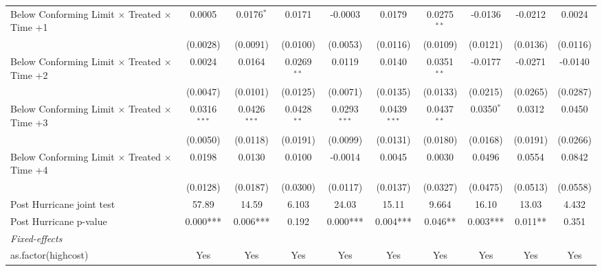 \begin{tabular}{lccccccccc}
   Below Conforming Limit $\times$ Treated $\times$ Time +1   & 0.0005         & 0.0176$^{*}$   & 0.0171        & -0.0003        & 0.0179         & 0.0275$^{**}$ & -0.0136      & -0.0212   & 0.0024\\   
                                                              & (0.0028)       & (0.0091)       & (0.0100)      & (0.0053)       & (0.0116)       & (0.0109)      & (0.0121)     & (0.0136)  & (0.0116)\\   
   Below Conforming Limit $\times$ Treated $\times$ Time +2   & 0.0024         & 0.0164         & 0.0269$^{**}$ & 0.0119         & 0.0140         & 0.0351$^{**}$ & -0.0177      & -0.0271   & -0.0140\\   
                                                              & (0.0047)       & (0.0101)       & (0.0125)      & (0.0071)       & (0.0135)       & (0.0133)      & (0.0215)     & (0.0265)  & (0.0287)\\   
   Below Conforming Limit $\times$ Treated $\times$ Time +3   & 0.0316$^{***}$ & 0.0426$^{***}$ & 0.0428$^{**}$ & 0.0293$^{***}$ & 0.0439$^{***}$ & 0.0437$^{**}$ & 0.0350$^{*}$ & 0.0312    & 0.0450\\   
                                                              & (0.0050)       & (0.0118)       & (0.0191)      & (0.0099)       & (0.0131)       & (0.0180)      & (0.0168)     & (0.0191)  & (0.0266)\\   
   Below Conforming Limit $\times$ Treated $\times$ Time +4   & 0.0198         & 0.0130         & 0.0100        & -0.0014        & 0.0045         & 0.0030        & 0.0496       & 0.0554    & 0.0842\\   
                                                              & (0.0128)       & (0.0187)       & (0.0300)      & (0.0117)       & (0.0137)       & (0.0327)      & (0.0475)     & (0.0513)  & (0.0558)\\   
   Post Hurricane joint test                                  & 57.89          & 14.59          & 6.103         & 24.03          & 15.11          & 9.664         & 16.10        & 13.03     & 4.432\\  
   Post Hurricane p-value                                     & 0.000***       & 0.006***       & 0.192         & 0.000***       & 0.004***       & 0.046**       & 0.003***     & 0.011**   & 0.351\\  
   \midrule
   \emph{Fixed-effects}\\
   as.factor(highcost)                                        & Yes            & Yes            & Yes           & Yes            & Yes            & Yes           & Yes          & Yes       & Yes\\  

\end{tabular}
